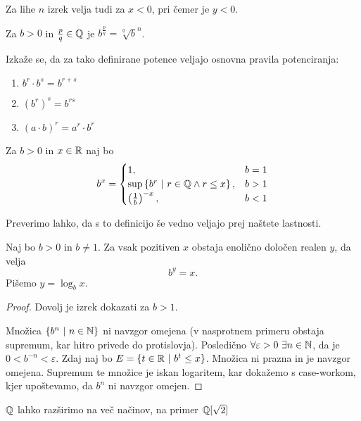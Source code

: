 \documentclass[12pt, a4paper]{article}
\begin{document}
\begin{opomba}
Za lihe $n$ izrek velja tudi za $x<0$, pri čemer je $y<0$.
\end{opomba}

\begin{definicija}
Za $b>0$ in $\frac{p}{q}\in\mathbb{Q}$ je $b^\frac{p}{q}=\sqrt[q]{b}^n$.
\end{definicija}

Izkaže se, da za tako definirane potence veljajo osnovna pravila potenciranja:

\begin{enumerate}[label=\roman*)]
\item $b^r\cdot b^s=b^{r+s}$
\item $(b^r)^s=b^{rs}$
\item $(a\cdot b)^r=a^r\cdot b^r$
\end{enumerate}

\begin{definicija}
Za $b>0$ in $x\in\mathbb{R}$ naj bo 
\[
b^x=\begin{cases}
1, &b=1 \\
\sup\left\{b^r~\middle\vert~r\in\mathbb{Q}\land r\leq x\right\}, &b>1 \\
\left(\frac{1}{b}\right)^{-x}, &b<1
\end{cases}
\]
\end{definicija}

Preverimo lahko, da s to definicijo še vedno veljajo prej naštete lastnosti.

\begin{izrek}
Naj bo $b>0$ in $b\ne 1$. Za vsak pozitiven $x$ obstaja enolično določen realen $y$, da velja
\[
b^y=x.
\]
Pišemo $y=\log_b x$.
\end{izrek}

\begin{proof}
Dovolj je izrek dokazati za $b>1$.

Množica $\left\{b^n~\middle\vert~n\in\mathbb{N}\right\}$ ni navzgor omejena (v nasprotnem primeru obstaja supremum, kar hitro privede do protislovja). Posledično $\forall\varepsilon>0~\exists n\in\mathbb{N}$, da je $0<b^{-n}<\varepsilon$. Zdaj naj bo $E=\left\{t\in\mathbb{R}~\middle\vert~b^t\leq x\right\}$. Množica ni prazna in je navzgor omejena. Supremum te množice je iskan logaritem, kar dokažemo s case-workom, kjer upoštevamo, da $b^n$ ni navzgor omejen.
\end{proof}

\begin{opomba}
$\mathbb{Q}$ lahko razširimo na več načinov, na primer $\mathbb{Q}[\sqrt{2}]$
\end{opomba}
\end{document}
